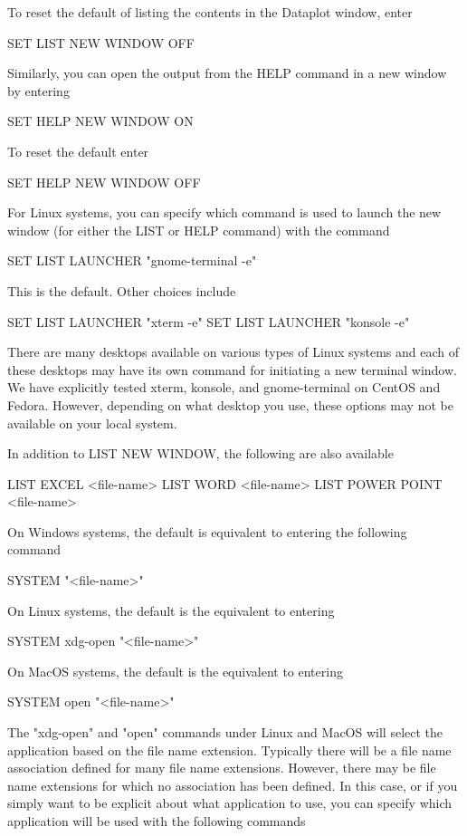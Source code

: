        To reset the default of listing the contents in the Dataplot
       window, enter

          SET LIST NEW WINDOW OFF

       Similarly, you can open the output from the HELP command in a
       new window by entering

          SET HELP NEW WINDOW ON

       To reset the default enter

          SET HELP NEW WINDOW OFF

       For Linux systems, you can specify which command is used
       to launch the new window (for either the LIST or HELP
       command) with the command

          SET LIST LAUNCHER  "gnome-terminal -e"

       This is the default.  Other choices include

          SET LIST LAUNCHER  "xterm -e"
          SET LIST LAUNCHER  "konsole -e"

       There are many desktops available on various types of Linux
       systems and each of these desktops may have its own
       command for initiating a new terminal window.  We have
       explicitly tested xterm, konsole, and gnome-terminal on
       CentOS and Fedora.  However, depending on what desktop you
       use, these options may not be available on your local system.

       In addition to LIST NEW WINDOW, the following are also available

          LIST EXCEL <file-name>
          LIST WORD <file-name>
          LIST POWER POINT <file-name>

       On Windows systems, the default is equivalent to entering
       the following command

             SYSTEM "<file-name>"

       On Linux systems, the default is the equivalent to entering

             SYSTEM xdg-open "<file-name>"

       On MacOS systems, the default is the equivalent to entering

             SYSTEM open "<file-name>"

       The "xdg-open" and "open" commands under Linux and MacOS
       will select the application based on the file name extension.
       Typically there will be a file name association defined for
       many file name extensions.  However, there may be file name
       extensions for which no association has been defined.  In this
       case, or if you simply want to be explicit about what application
       to use, you can specify which application will be used with the
       following commands

